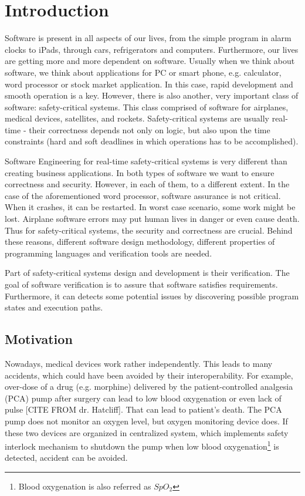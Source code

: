 
\cleardoublepage

\chapter{Introduction}
\label{introduction}

Software is present in all aspects of our lives, from the simple program in alarm clocks to iPads, through cars, refrigerators and computers. Furthermore, our lives are getting more and more dependent on software. Usually when we think about software, we think about applications for PC or smart phone, e.g. calculator, word processor or stock market application. In this case, rapid development and smooth operation is a key. However, there is also another, very important class of software: safety-critical systems. This class comprised of software for airplanes, medical devices, satellites, and rockets. Safety-critical systems are usually real-time - their correctness depends not only on logic, but also upon the time constraints (hard and soft deadlines in which operations has to be accomplished).

Software Engineering for real-time safety-critical systems is very different than creating business applications. In both types of software we want to ensure correctness and security. However, in each of them, to a different extent. In the case of the aforementioned word processor, software assurance is not critical. When it crashes, it can be restarted. In worst case scenario, some work might be lost. Airplane software errors may put human lives in danger or even cause death. Thus for safety-critical systems, the security and correctness are crucial. Behind these reasons, different software design methodology, different properties of programming languages and verification tools are needed.

Part of safety-critical systems design and development is their verification. The goal of software verification is to assure that software satisfies requirements. Furthermore, it can detects some potential issues by discovering possible program states and execution paths.


\section{Motivation}
\label{introduction:motivation}

Nowadays, medical devices work rather independently. This leads to many accidents, which could have been avoided by their interoperability. For example, over-dose of a drug (e.g. morphine) delivered by the patient-controlled analgesia (PCA) pump after surgery can lead to low blood oxygenation or even lack of pulse [CITE FROM dr. Hatcliff]. That can lead to patient's death. The PCA pump does not monitor an oxygen level, but oxygen monitoring device does. If these two devices are organized in centralized system, which implements safety interlock mechanism to shutdown the pump when low blood oxygenation\footnote{Blood oxygenation is also referred as $SpO_{2}$} is detected, accident can be avoided. 

